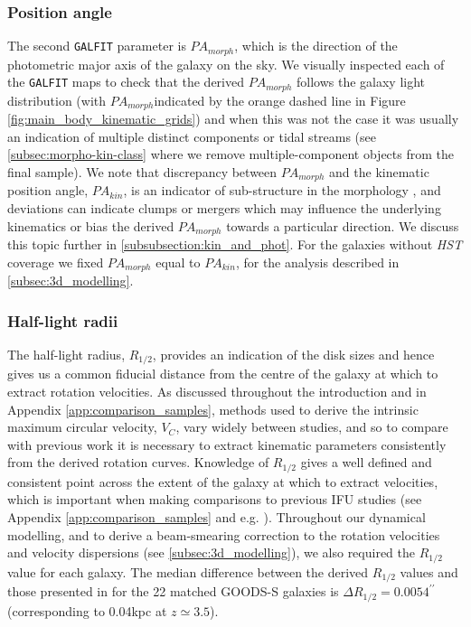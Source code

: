 \documentclass[fleqn,usenatbib]{mnras}
\begin{document}
\subsubsection{Position angle}\label{subsubsection:position_angle}
The second {\tt GALFIT} parameter is $PA_{morph}$, which is the direction of the photometric major axis of the galaxy on the sky.
We visually inspected each of the {\tt GALFIT} maps to check that the derived $PA_{morph}$ follows the galaxy light distribution (with $PA_{morph}$indicated by the orange dashed line in Figure \ref{fig:main_body_kinematic_grids}) and when this was not the case it was usually an indication of multiple distinct components or tidal streams (see \cref{subsec:morpho-kin-class} where we remove multiple-component objects from the final sample).
We note that discrepancy between $PA_{morph}$ and the kinematic position angle, $PA_{kin}$, is an indicator of sub-structure in the morphology \citep[e.g.][]{Queyrel2012,Wisnioski2015,Rodrigues2017}, and deviations can indicate clumps or mergers which may influence the underlying kinematics or bias the derived $PA_{morph}$ towards a particular direction.
We discuss this topic further in \cref{subsubsection:kin_and_phot}.
For the galaxies without {\em HST} coverage we fixed $PA_{morph}$ equal to $PA_{kin}$, for the analysis described in \cref{subsec:3d_modelling}.


\subsubsection{Half-light radii}\label{subsubsection:half-light_radii}
The half-light radius, $R_{1/2}$, provides an indication of the disk sizes and hence gives us a common fiducial distance from the centre of the galaxy at which to extract rotation velocities.
As discussed throughout the introduction and in Appendix \ref{app:comparison_samples}, methods used to derive the intrinsic maximum circular velocity, $V_{C}$, vary widely between studies, and so to compare with previous work it is necessary to extract kinematic parameters consistently from the derived rotation curves.
Knowledge of $R_{1/2}$ gives a well defined and consistent point across the extent of the galaxy at which to extract velocities, which is important when making comparisons to previous IFU studies (see Appendix \ref{app:comparison_samples} and e.g. \citealt{ForsterSchreiber2009,Epinat2012,Wisnioski2015,Stott2016,Harrison2017,Swinbank2017}).
Throughout our dynamical modelling, and to derive a beam-smearing correction to the rotation velocities and velocity dispersions (see \cref{subsec:3d_modelling}), we also required the $R_{1/2}$ value for each galaxy.
The median difference between the derived $R_{1/2}$ values and those presented in \cite{VanderWel2012} for the 22 matched GOODS-S galaxies is $\Delta R_{1/2} = 0.0054^{\prime\prime}$ (corresponding to 0.04kpc at $z\simeq3.5$).
\end{document}

